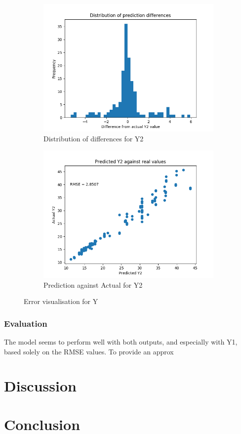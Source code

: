 \documentclass[12pt]{article}
\begin{document}
\begin{figure}[!ht]
\centering
\begin{subfigure}{.5\textwidth}
  \centering
  \includegraphics[width=\linewidth]{images/Y2errordist}
  \caption{Distribution of differences for Y2}
  \label{fig:y2diffdist}
\end{subfigure}%
\begin{subfigure}{.5\textwidth}
  \centering
  \includegraphics[width=\linewidth]{images/Y2scatter}
  \caption{Prediction against Actual for Y2}
  \label{fig:y2diffscatter}
\end{subfigure}
\caption{Error visualisation for Y}
\label{fig:y2error}
\end{figure}

\section{Evaluation}

The model seems to perform well with both outputs, and especially with Y1, based solely on the RMSE values. To provide an approx 

\part{Discussion}



\part{Conclusion}



\end{document}
